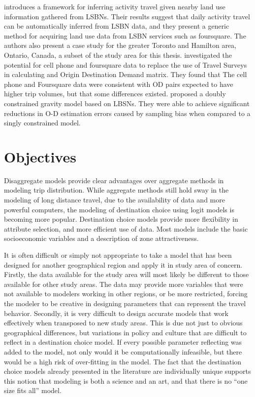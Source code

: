 \textcite{abdulazim2015framework} introduces a framework for inferring activity travel given nearby land use information gathered from LSBNs. Their results suggest that daily activity travel can be automatically inferred from LSBN data, and they present a generic method for acquiring land use data from LSBN services such as foursquare. The authors also present a case study for the  greater Toronto and Hamilton area, Ontario, Canada, a subset of the study area for this thesis.
\textcite{sa2015origin} investigated the potential for cell phone and foursquare data to replace the use of Travel Surveys in calculating and Origin Destination Demand matrix. They found that The cell phone and Foursquare data were consistent with OD pairs expected to have higher trip volumes, but that some differences existed.
\textcite{jin2014location} proposed a doubly constrained gravity model based on LBSNs. They were able to achieve significant reductions in O-D estimation errors caused by sampling bias when compared to a singly constrained model.

\section{Objectives}
Disaggregate models provide clear advantages over aggregate methods in modeling trip distribution. While aggregate methods still hold sway in the modeling of long distance travel, due to the availability of data and more powerful computers, the modeling of destination choice using logit models is becoming more popular. Destination choice models provide more flexibility in attribute selection, and more efficient use of data. Most models include the basic socioeconomic variables and a description of zone attractiveness. 

It is often difficult or simply not appropriate to take a model that has been designed for another geographical region and apply it in study area of concern. Firstly, the data available for the study area will most likely be different to those available for other study areas. The data may provide more variables that were not available to modelers working in other regions, or be more restricted, forcing the modeler to be creative in designing parameters that can represent the travel behavior. Secondly, it is very difficult to design accurate models that work effectively when transposed to new study areas. This is due not just to obvious geographical differences, but variations in policy and culture that are difficult to reflect in a destination choice model. If every possible parameter reflecting was added to the model, not only would it be computationally infeasible, but there would be a high risk of over-fitting in the model. The fact that the destination choice models already presented in the literature are individually unique supports this notion that modeling is both a science and an art, and that there is no \enquote{one size fits all} model.

